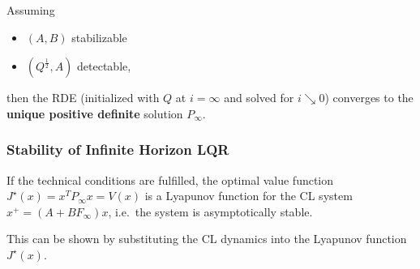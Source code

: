 \newpar{}

Assuming
\begin{itemize}
    \item $(A,B)$ stabilizable
    \item $(Q^{\frac{1}{2}}, A)$ detectable,
\end{itemize}
then the RDE (initialized with $Q$ at $i = \infty$ and solved for $i\searrow 0$) converges to the \textbf{unique positive definite} solution $P_{\infty}$.

\subsubsection{Stability of Infinite Horizon LQR}

If the technical conditions are fulfilled, the optimal value function $J^{\star} (x) = x^T P_{\infty} x = V(x)$ is a Lyapunov function for the CL system $x^+ = (A + BF_{\infty} )x$, i.e.\ the system is asymptotically stable.

This can be shown by substituting the CL dynamics into the Lyapunov function $J^{\star} (x)$.




